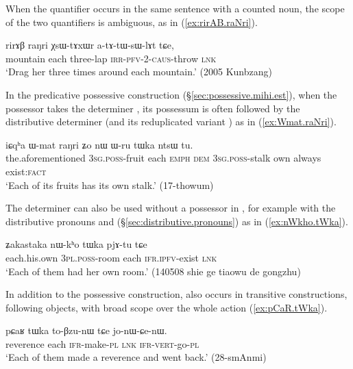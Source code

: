 When the quantifier  occurs in the same sentence with a counted noun, the scope of the two quantifiers is ambiguous, as in (\ref{ex:rirAB.raNri}).

\begin{exe}
\ex \label{ex:rirAB.raNri}
\gll rirɤβ raŋri χsɯ-tɤxɯr a-tɤ-tɯ-sɯ-lɤt tɕe, \\
mountain each three-lap \textsc{irr}-\textsc{pfv}-2-\textsc{caus}-throw \textsc{lnk} \\
\glt `Drag her three times around each mountain.' (2005 Kunbzang)
 \end{exe}
 
In the predicative possessive construction (§\ref{sec:possessive.mihi.est}), when the possessor takes the determiner , its possessum is often  followed by the distributive determiner  (and its reduplicated variant ) as in (\ref{ex:Wmat.raNri}).
 
  \begin{exe}
\ex \label{ex:Wmat.raNri}
\gll   iɕqʰa ɯ-mat raŋri ʑo nɯ ɯ-ru tɯka ntsɯ tu. \\
the.aforementioned \textsc{3sg}.\textsc{poss}-fruit each \textsc{emph} \textsc{dem} \textsc{3sg}.\textsc{poss}-stalk own always exist:\textsc{fact} \\
\glt `Each of its fruits has its own stalk.' (17-thowum)
  \end{exe}
  
The  determiner  can also be used without a possessor in , for example with the distributive pronouns  and  (§\ref{sec:distributive.pronouns})  as in (\ref{ex:nWkho.tWka}).

   \begin{exe}
\ex \label{ex:nWkho.tWka}
\gll   ʑakastaka nɯ-kʰo tɯka pjɤ-tu tɕe \\
each.his.own \textsc{3pl}.\textsc{poss}-room each \textsc{ifr}.\textsc{ipfv}-exist \textsc{lnk} \\
\glt `Each of them had her own room.' (140508 shie ge tiaowu de gongzhu)
   \end{exe}
   
In addition to the possessive construction,  also occurs in transitive constructions, following objects, with broad scope over the whole action (\ref{ex:pCaR.tWka}).

\begin{exe}
\ex \label{ex:pCaR.tWka}
\gll  pɕaʁ tɯka to-βzu-nɯ tɕe jo-nɯ-ɕe-nɯ.  \\
reverence each \textsc{ifr}-make-\textsc{pl} \textsc{lnk} \textsc{ifr}-\textsc{vert}-go-\textsc{pl} \\
\glt `Each of them made a reverence and went back.'  (28-smAnmi) 
\end{exe}

